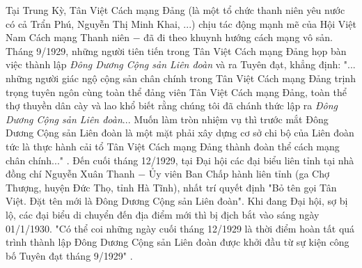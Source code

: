 Tại Trung Kỳ, Tân Việt Cách mạng Đảng (là một tổ chức thanh niên yêu nước có cả Trẩn Phú, Nguyễn Thị Minh Khai, ...) chịu tác động mạnh mẽ của Hội Việt Nam Cách mạng Thanh niên $-$ đã đi theo khuynh hướng cách mạng vô sản. Tháng 9/1929, những người tiên tiến trong Tân Việt Cách mạng Đảng họp bàn việc thành lập \textit{Đông Dương Cộng sản Liên đoàn} và ra Tuyên đạt, khẳng định: "... những người giác ngộ cộng sản chân chính trong Tân Việt Cách mạng Đảng trịnh trọng tuyên ngôn cùng toàn thể đảng viên Tân Việt Cách mạng Đảng, toàn thể thợ thuyền dân cày và lao khổ biết rằng chúng tôi đã chánh thức lập ra \textit{Đông Dương Cộng sản Liên đoàn}... Muốn làm tròn nhiệm vụ thì trước mắt Đông Dương Cộng sản Liên đoàn là một mặt phải xây dựng cơ sở chi bộ của Liên đoàn tức là thực hành cải tổ Tân Việt Cách mạng Đảng thành đoàn thể cách mạng chân chính..." . Đến cuối tháng 12/1929, tại Đại hội các đại biểu liên tỉnh tại nhà đồng chí Nguyễn Xuân Thanh $-$ Ủy viên Ban Chấp hành liên tỉnh (ga Chợ Thượng, huyện Đức Thọ, tỉnh Hà Tĩnh), nhất trí quyết định "Bỏ tên gọi Tân Việt. Đặt tên mới là Đông Dương Cộng sản Liên đoàn". Khi đang Đại hội, sợ bị lộ, các đại biểu di chuyển đến địa điểm mới thì bị địch bắt vào sáng ngày 01/1/1930. "Có thể coi những ngày cuối tháng 12/1929 là thời điểm hoàn tất quá trình thành lập Đông Dương Cộng sản Liên đoàn được khởi đầu từ sự kiện công bố Tuyên đạt tháng 9/1929" .